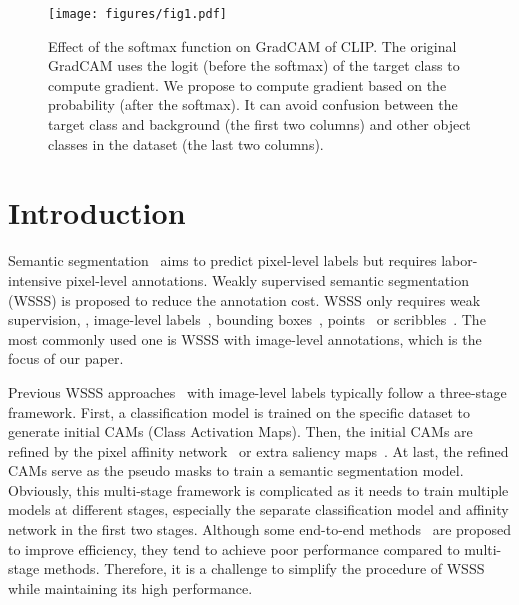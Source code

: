 \documentclass[10pt,twocolumn,letterpaper]{article}
\begin{document}
\begin{figure}[t]
  \centering
\texttt{[image: figures/fig1.pdf]}
    \vspace{-6mm}
   \caption{Effect of the softmax function on GradCAM of CLIP. The original GradCAM uses the logit (before the softmax) of the target class to compute gradient. We propose to compute gradient based on the probability (after the softmax). It can avoid confusion between the target class and background (the first two columns) and other object classes in the dataset (the last two columns).
   }
   \label{fig:1}
   \vspace{-2mm}
\end{figure}

\section{Introduction}
\label{sec:introduction}

Semantic segmentation~\cite{Strudel2021SegmenterTF,chen2017deeplab} aims to predict pixel-level labels but requires labor-intensive pixel-level annotations. Weakly supervised semantic segmentation (WSSS) is proposed to reduce the annotation cost. WSSS only requires weak supervision, \eg, image-level labels~\cite{Ahn2018PSA}, bounding boxes~\cite{Dai2015BoxSupEB,Papandreou2015WeaklyandSL}, points~\cite{bearman2016spoint} or scribbles~\cite{Lin2016ScribbleSupSC,Vernaza2017LearningRL}. The most commonly used one is WSSS with image-level annotations, which is the focus of our paper.

Previous WSSS approaches~\cite{Lee2021advcam, Wang2020SEAM, xu2022mctformer, Xie_2022_CLIMS} with image-level labels typically follow a three-stage framework. First, a classification model is trained on the specific dataset to generate initial CAMs (Class Activation Maps). Then, the initial CAMs are refined by the pixel affinity network~\cite{Ahn2018PSA,Ahn2019IRN} or extra saliency maps~\cite{Jiang2019OOA,Sun2020MCIS}. At last, the refined CAMs serve as the pseudo masks to train a semantic segmentation model. Obviously, this multi-stage framework is complicated as it needs to train multiple models at different stages, especially the separate classification model and affinity network in the first two stages. Although some end-to-end methods~\cite{Araslanov_2020_CVPR_single_stage,zhang2020reliability_single_stage} are proposed to improve efficiency, they tend to achieve poor performance compared to multi-stage methods. Therefore, it is a challenge to simplify the procedure of WSSS while maintaining its high performance. 
\end{document}
